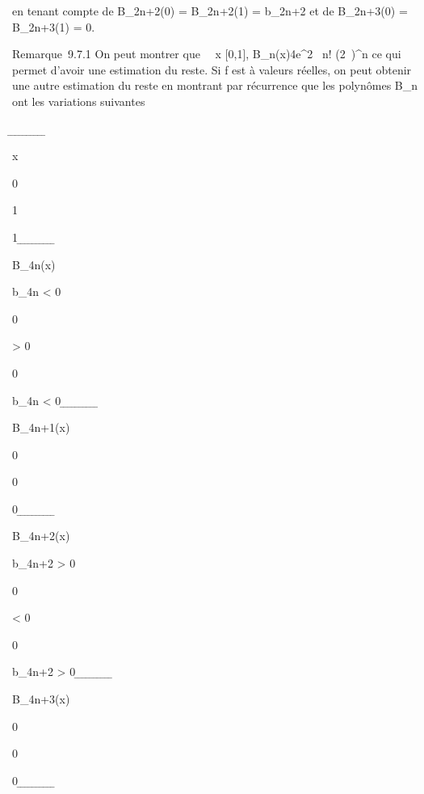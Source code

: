 \documentclass[]{article}
\begin{document}
en tenant compte de B_2n+2(0) = B_2n+2(1) =
b_2n+2 et de B_2n+3(0) = B_2n+3(1) = 0.

Remarque~9.7.1 On peut montrer que \forall~~x \in
{[}0,1{]}, B_n(x)\leq 4e^2\pi~ n!
\over (2\pi~)^n ce qui permet d'avoir une
estimation du reste. Si f est à valeurs réelles, on peut obtenir une
autre estimation du reste en montrant par récurrence que les polynômes
B_n ont les variations suivantes

̲ ̲ ̲ ̲ ̲ ̲ ̲ ̲ ̲ ̲

x

0

1

1 ̲ ̲ ̲ ̲ ̲ ̲ ̲ ̲ ̲ ̲

B_4n(x)

b_4n \textless{} 0

\nearrow

0

\nearrow

\textgreater{} 0

\searrow

0

\searrow

b_4n \textless{} 0 ̲ ̲ ̲ ̲ ̲ ̲ ̲ ̲ ̲ ̲

B_4n+1(x)

0

\searrow

\nearrow

0

\nearrow

\searrow

0 ̲ ̲ ̲ ̲ ̲ ̲ ̲ ̲ ̲ ̲

B_4n+2(x)

b_4n+2 \textgreater{} 0

\searrow

0

\searrow

\textless{} 0

\nearrow

0

\nearrow

b_4n+2 \textgreater{} 0 ̲ ̲ ̲ ̲ ̲ ̲ ̲ ̲ ̲ ̲

B_4n+3(x)

0

\nearrow

\searrow

0

\searrow

\nearrow

0 ̲ ̲ ̲ ̲ ̲ ̲ ̲ ̲ ̲ ̲
\end{document}

